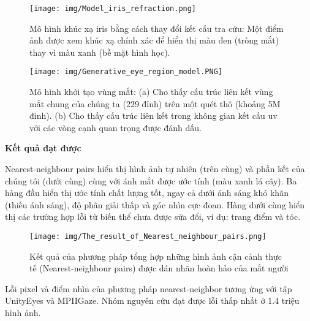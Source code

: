 \begin{center}
    \begin{figure}[h!]
    \begin{center}
     \texttt{[image: img/Model\_iris\_refraction.png]}
    \end{center}
    \caption{Mô hình khúc xạ iris bằng cách thay đổi kết cấu tra cứu: Một điểm ảnh được xem khúc xạ chính xác để hiển thị màu đen (tròng mắt) thay vì màu xanh (bề mặt hình học).}
    \label{refhinh15}
    \end{figure}
\end{center}

\begin{center}
    \begin{figure}[h!]
    \begin{center}
     \texttt{[image: img/Generative\_eye\_region\_model.PNG]}
    \end{center}
    \caption{Mô hình khởi tạo vùng mắt: (a) Cho thấy cấu trúc liên kết vùng mắt chung của chúng ta (229 đỉnh) trên một quét thô (khoảng 5M đỉnh). (b) Cho thấy cấu trúc liên kết trong không gian kết cấu uv với các vòng cạnh quan trọng được đánh dấu.}
    \label{refhinh15}
    \end{figure}
\end{center}

\textbf{Kết quả đạt được}

Nearest-neighbour pairs hiển thị hình ảnh tự nhiên (trên cùng) và phần kết của chúng tôi (dưới cùng) cùng với ánh mắt được ước tính (màu xanh lá cây).
Ba hàng đầu hiển thị ước tính chất lượng tốt, ngay cả dưới ánh sáng khó khăn (thiếu ánh sáng), độ phân giải thấp và góc nhìn cực đoan.
Hàng dưới cùng hiển thị các trường hợp lỗi từ biến thể chưa được sửa đổi, ví dụ: trang điểm và tóc.

\begin{center}
    \begin{figure}[h!]
    \begin{center}
     \texttt{[image: img/The\_result\_of\_Nearest\_neighbour\_pairs.png]}
    \end{center}
    \caption{Kết quả của phương pháp tổng hợp những hình ảnh cận cảnh thực tế (Nearest-neighbour pairs) được dán nhãn hoàn hảo của mắt người }
    \label{refhinh15}
    \end{figure}
\end{center}

Lỗi pixel và điểm nhìn của phương pháp nearest-neighbor tương ứng với tập UnityEyes và MPIIGaze. Nhóm nguyên cứu đạt được lỗi thấp nhất ở 1.4 triệu hình ảnh.


